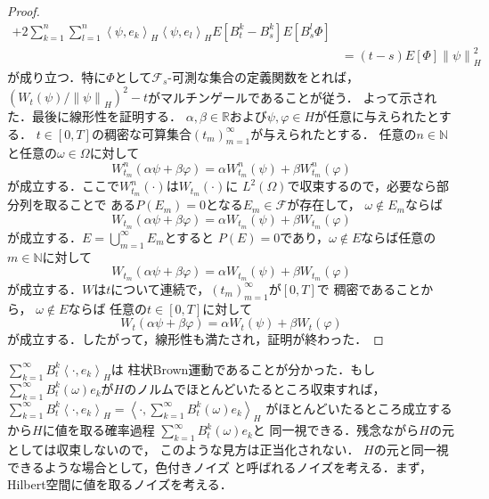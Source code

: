 \documentclass[dvipdfmx,autodetect-engine]{jsarticle}
\theoremstyle{remark}
\theoremstyle{definition}
\newcommand{\R}{\mathbb{R}}
\newcommand{\N}{\mathbb{N}}
\newcommand{\norm}[1]{\left\lVert#1\right\rVert}
\newcommand{\paren}[1]{\left( #1 \right)}
\newcommand{\iprod}[1]{\left\langle #1 \right\rangle}
\begin{document}
\begin{proof}
\begin{align}
         +
        2\sum_{k=1}^{n}\sum_{l=1}^{n} \iprod{\psi,e_{k}}_{H} \iprod{\psi,e_{l}}_{H}
        E\left[
             B_{t}^{k} -B_{s}^{k}
        \right]
        E\left[
            B_{s}^{l}\Phi
        \right]\\
        &= (t-s) E\left[\Phi \right] \norm{\psi}_{H}^{2}
    \end{align}
    が成り立つ．特に$\Phi$として$\mathcal{F}_{s}$-可測な集合の定義関数をとれば，
    $\paren{W_{t}(\psi) / \norm{\psi}_{H}}^{2} - t$がマルチンゲールであることが従う．
    よって示された．最後に線形性を証明する．
    $\alpha,\beta\in \R$および$\psi,\varphi \in H$が任意に与えられたとする．
    $t \in [0,T]$の稠密な可算集合$(t_{m})_{m=1}^{\infty}$が与えられたとする．
    任意の$n \in \N$と任意の$\omega \in \Omega$に対して
    \begin{equation}
        W_{t_{m}}^{n}(\alpha \psi + \beta \varphi) 
        = \alpha W_{t_{m}}^{n}(\psi) + \beta W_{t_{m}}^{n}(\varphi)
    \end{equation}
    が成立する．ここで$W_{t_{m}}^{n} (\cdot)$は$W_{t_{m}}(\cdot)$に
    $L^{2}(\Omega)$で収束するので，必要なら部分列を取ることで
    ある$P(E_{m})=0$となる$E_{m}\in \mathcal{F}$が存在して，
    $\omega \notin E_{m}$ならば
    \begin{equation}
        W_{t_{m}}(\alpha \psi + \beta \varphi) 
        = \alpha W_{t_{m}}(\psi) + \beta W_{t_{m}}(\varphi)
    \end{equation}
    が成立する．$E = \bigcup_{m=1}^{\infty} E_{m}$とすると
    $P(E) = 0$であり，$\omega \notin E$ならば任意の$m \in \N$に対して
    \begin{equation}
        W_{t_{m}}(\alpha \psi + \beta \varphi) 
        = \alpha W_{t_{m}}(\psi) + \beta W_{t_{m}}(\varphi)
    \end{equation}
    が成立する．$W$は$t$について連続で，$(t_{m})_{m=1}^{\infty}$が$[0,T]$で
    稠密であることから，
    $\omega \notin E$ならば
    任意の$t \in [0,T]$に対して
    \begin{equation}
        W_{t}(\alpha \psi + \beta \varphi) 
        = \alpha W_{t}(\psi) + \beta W_{t}(\varphi)
    \end{equation}
    が成立する．したがって，線形性も満たされ，証明が終わった．
\end{proof}

$\sum_{k=1}^{\infty} B_{t}^{k} \iprod{\cdot, e_{k}}_{H}$は
柱状Brown運動であることが分かった．もし$\sum_{k=1}^{\infty} 
B_{t}^{k}(\omega)e_{k}$が$H$のノルムでほとんどいたるところ収束すれば，
$\sum_{k=1}^{\infty} B_{t}^{k} \iprod{\cdot, e_{k}}_{H}
= \iprod{\cdot, \sum_{k=1}^{\infty} B_{t}^{k}(\omega)e_{k}}_{H}$
がほとんどいたるところ成立するから$H$に値を取る確率過程
$\sum_{k=1}^{\infty} B_{t}^{k}(\omega)e_{k}$と
同一視できる．残念ながら$H$の元としては収束しないので，
このような見方は正当化されない．
$H$の元と同一視できるような場合として，色付きノイズ
と呼ばれるノイズを考える．まず，
Hilbert空間に値を取るノイズを考える．
\end{document}
